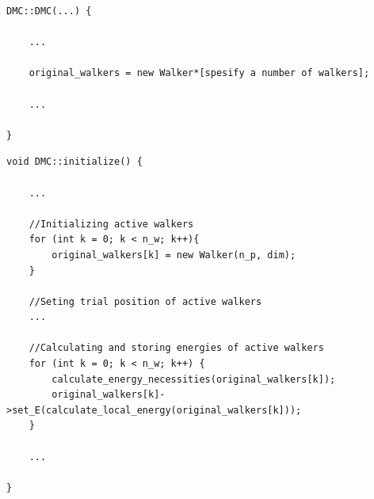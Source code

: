 \vspace{0.5 cm}
\begin{lstlisting}
DMC::DMC(...) {

    ...
 
    original_walkers = new Walker*[spesify a number of walkers];
    
    ...

}
\end{lstlisting}


\begin{lstlisting}
void DMC::initialize() {

    ...

    //Initializing active walkers
    for (int k = 0; k < n_w; k++){
        original_walkers[k] = new Walker(n_p, dim);
    }
    
    //Seting trial position of active walkers
    ...

    //Calculating and storing energies of active walkers
    for (int k = 0; k < n_w; k++) {
        calculate_energy_necessities(original_walkers[k]);
        original_walkers[k]->set_E(calculate_local_energy(original_walkers[k]));
    }

    ...

}
\end{lstlisting}

